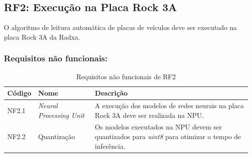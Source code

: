 \subsection{RF2: Execução na Placa Rock 3A}

O algoritmo de leitura automática de placas de veículos deve ser executado na placa Rock 3A da Radxa.

\subsubsection{Requisitos não funcionais:}

\begin{table}[H]
    \centering
    \begin{tabular}{| m{2cm} | m{3.5cm} | m{8cm} |}
        \hline
        Código & Nome & Descrição \\
        \hline \hline
        NF2.1 & \textit{Neural Processing Unit} & A execução dos modelos de redes neurais na placa Rock 3A deve ser realizada na NPU. \\
        \hline
        NF2.2 & Quantização & Os modelos executados na NPU devem ser quantizados para \textit{uint8} para otimizar o tempo de inferência. \\
        \hline
    \end{tabular}
    \caption{Requisitos não funcionais de RF2}
    \label{tab:rf2_table}
\end{table}